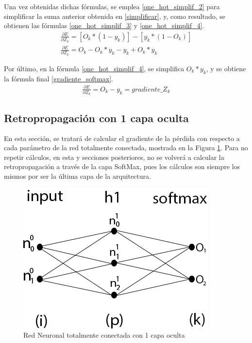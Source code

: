 Una vez obtenidas dichas fórmulas, se emplea \ref{one_hot_simplif_2} para simplificar la suma anterior obtenida en \ref{simplificar}, y, como resultado, se obtienen las fórmulas \ref{one_hot_simplif_3} y \ref{one_hot_simplif_4}. \\


\begin{gather}
	\frac{\partial E}{\partial Z_k} = [O_k*(1-y_k)] - [y_k*(1-O_k)] \label{one_hot_simplif_3} \\
	\frac{\partial E}{\partial Z_k} = O_k - O_k * y_k - y_k + O_k * y_k  \label{one_hot_simplif_4}
\end{gather}

Por último, en la fórmula \ref{one_hot_simplif_4}, se simplifica $O_k*y_k$, y se obtiene la fórmula final \ref{gradiente_softmax}. \\
\begin{gather}
	\frac{\partial E}{\partial Z_k} = O_k - y_k = gradiente\_Z_k
	\label{gradiente_softmax}
\end{gather}

\subsection{Retropropagación con 1 capa oculta \cite{NN_backpropagation} \cite{NN_backprop_2} \label{backprop_1_capa}}

En esta sección, se tratará de calcular el gradiente de la pérdida con respecto a cada parámetro de la red totalmente conectada, mostrada en la Figura \ref{fig:nn_1_capa}. Para no repetir cálculos, en esta y secciones posteriores, no se volverá a calcular la retropropagación a través de la capa SoftMax, pues los cálculos son siempre los mismos por ser la última capa de la arquitectura.

\begin{figure}[H]
	\centering
	\includegraphics[scale=0.35]{imagenes/nn_1_capa.jpg}  
	\caption{Red Neuronal totalmente conectada con 1 capa oculta}
	\label{fig:nn_1_capa}
\end{figure}

